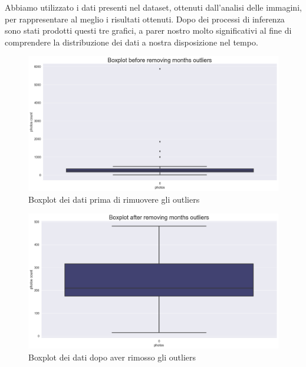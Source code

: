 \documentclass[12pt,a4paper,twoside]{article}
\begin{document}
Abbiamo utilizzato i dati presenti nel dataset, ottenuti dall'analisi delle immagini, per 
rappresentare al meglio i risultati ottenuti. Dopo dei processi di inferenza sono stati prodotti 
questi tre grafici, a parer nostro molto significativi al fine di comprendere la distribuzione 
dei dati a nostra disposizione nel tempo. \\
\begin{figure}[h!]
    \centering
    \includegraphics[width=\textwidth, height=\textheight, keepaspectratio]{assets/boxplot-outliers.png}
    \caption{Boxplot dei dati prima di rimuovere gli outliers}
    \label{fig:boxplot-outliers}
\end{figure}
\begin{figure}[h!]
    \centering
    \includegraphics[width=\textwidth, height=\textheight, keepaspectratio]{assets/boxplot-wout-outliers.png}
    \caption{Boxplot dei dati dopo aver rimosso gli outliers}
    \label{fig:boxplot-wout-outliers}
\end{figure}
\end{document}

